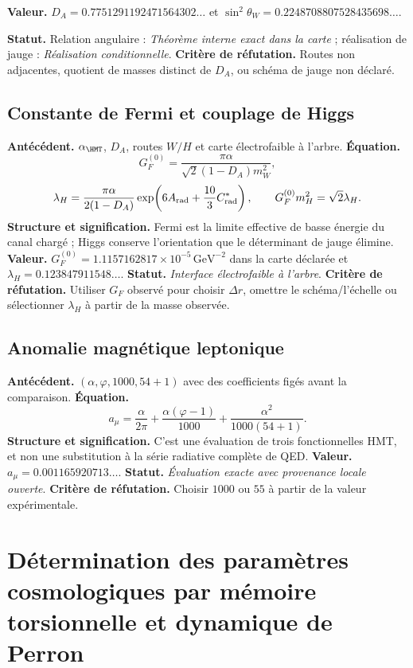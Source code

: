\textbf{Valeur.} \(D_A=0.7751291192471564302\ldots\) et
\(\sin^2\theta_W=0.2248708807528435698\ldots\).

\textbf{Statut.} Relation angulaire : \emph{Théorème interne exact dans la carte} ;
réalisation de jauge : \emph{Réalisation conditionnelle}.
\textbf{Critère de réfutation.} Routes non adjacentes, quotient de masses
distinct de \(D_A\), ou schéma de jauge non
déclaré.

\subsection*{Constante de Fermi et couplage de Higgs }
\textbf{Antécédent.} \(\alpha_{\HMT}\), \(D_A\), routes \(W/H\) et carte
électrofaible à l'arbre. \textbf{Équation.}
\[
G_F^{(0)}=\frac{\pi\alpha}{\sqrt2(1-D_A)m_W^2},
\]
\[
\lambda_H=\frac{\pi\alpha}{2(1-D_A)}
\exp\!\left(6A_{\rm rad}+\frac{10}{3}C^*_{\rm rad}\right),
\qquad G_F^{(0)}m_H^2=\sqrt2\lambda_H.
\]
\textbf{Structure et signification.} Fermi est la limite effective de basse
énergie du canal chargé ; Higgs conserve l'orientation que le
déterminant de jauge élimine.
\textbf{Valeur.} \(G_F^{(0)}=1.1157162817\times10^{-5}\,\mathrm{GeV}^{-2}\)
dans la carte déclarée et \(\lambda_H=0.123847911548\ldots\).
\textbf{Statut.} \emph{Interface électrofaible à l'arbre}.
\textbf{Critère de réfutation.} Utiliser \(G_F\) observé pour choisir \(\Delta r\), omettre
le schéma/l'échelle ou sélectionner \(\lambda_H\) à partir de la masse observée.

\subsection*{Anomalie magnétique leptonique }
\textbf{Antécédent.} \((\alpha,\varphi,1000,54+1)\) avec des coefficients
figés avant la comparaison. \textbf{Équation.}
\begin{equation}
a_\mu=\frac{\alpha}{2\pi}
+\frac{\alpha(\varphi-1)}{1000}
+\frac{\alpha^2}{1000(54+1)}.
\label{eq:atlas-anom-mu}
\end{equation}
\textbf{Structure et signification.} C'est une évaluation de trois fonctionnelles HMT,
et non une substitution à la série radiative complète de QED.
\textbf{Valeur.} \(a_\mu=0.001165920713\ldots\).
\textbf{Statut.} \emph{Évaluation exacte avec provenance locale ouverte}.
\textbf{Critère de réfutation.} Choisir \(1000\) ou \(55\) à partir de la valeur expérimentale.

\section{Détermination des paramètres cosmologiques par mémoire torsionnelle et dynamique de Perron}

